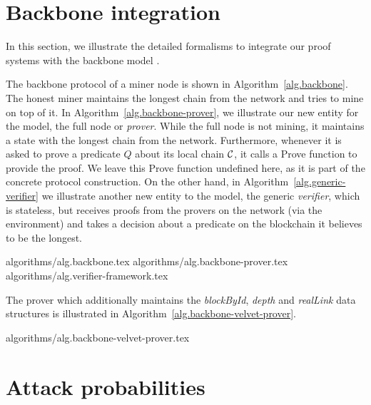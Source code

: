 \section{Backbone integration}
\label{sec.appendix-backbone}


In this section, we illustrate the detailed formalisms to integrate our proof
systems with the backbone model \cite{backbone}.

The backbone protocol of a miner node is shown in Algorithm~\ref{alg.backbone}.
The honest miner maintains the longest chain from the network and tries to mine
on top of it. In Algorithm~\ref{alg.backbone-prover}, we illustrate our new
entity for the model, the full node or \textit{prover}.  While the full node is
not mining, it maintains a state with the longest chain from the network.
Furthermore, whenever it is asked to prove a predicate $Q$ about its local
chain $\mathcal{C}$, it calls a Prove function to provide the proof.  We leave this
Prove function undefined here, as it is part of the concrete protocol
construction. On the other hand, in Algorithm~\ref{alg.generic-verifier} we
illustrate another new entity to the model, the generic \textit{verifier},
which is stateless, but receives proofs from the provers on the network (via
the environment) and takes a decision about a predicate on the blockchain it
believes to be the longest.

{algorithms/alg.backbone.tex}
{algorithms/alg.backbone-prover.tex}
{algorithms/alg.verifier-framework.tex}

The prover which additionally maintains the \textit{blockById},
\textit{depth} and \textit{realLink} data structures is illustrated in
Algorithm~\ref{alg.backbone-velvet-prover}.

{algorithms/alg.backbone-velvet-prover.tex}

\section{Attack probabilities}

